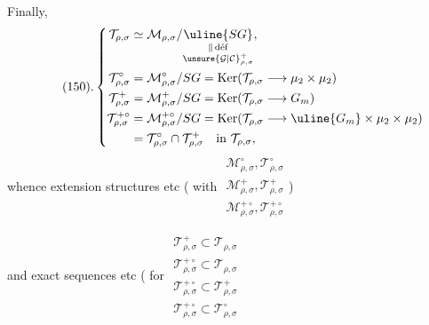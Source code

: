 Finally, 
\[
\tag*{(150).}
\left\{\begin{aligned}
\mathcal{T}_{\rho,\sigma}&\simeq
\mathcal{M}_{\rho,\sigma}/
\underset{\substack{\Vert\,\mathrm{d\acute ef}\\\unsure{\mathcal{G}|\mathcal{C}}_{\rho,\sigma}^{+}}}{\uline{SG}},\\
\mathcal{T}_{\rho,\sigma}^{\circ}&=
\mathcal{M}_{\rho,\sigma}^{\circ}/SG
=\operatorname{Ker}(\mathcal{T}_{\rho,\sigma}\longrightarrow\mu_2\times\mu_2)\\
\mathcal{T}_{\rho,\sigma}^{+}&=
\mathcal{M}_{\rho,\sigma}^{+}/SG
=\operatorname{Ker}(\mathcal{T}_{\rho,\sigma}\longrightarrow G_m)\\
\mathcal{T}_{\rho,\sigma}^{+\circ}&=
\mathcal{M}_{\rho,\sigma}^{+\circ}/SG
=\operatorname{Ker}(\mathcal{T}_{\rho,\sigma}\longrightarrow\uline{G_m}\times\mu_2\times\mu_2)\\
&=\mathcal{T}_{\rho,\sigma}^{\circ}\cap\mathcal{T}_{\rho,\sigma}^{+}
\quad\text{in }\mathcal{T}_{\rho,\sigma},
\end{aligned}\right.
\]
whence extension structures
etc ( with
$\begin{array}{l}
\mathcal{M}_{\rho,\sigma}^{\circ},\mathcal{T}_{\rho,\sigma}^{\circ}\\
\mathcal{M}_{\rho,\sigma}^{+},\mathcal{T}_{\rho,\sigma}^{+}\\
\mathcal{M}_{\rho,\sigma}^{+\circ},\mathcal{T}_{\rho,\sigma}^{+\circ}
\end{array}$)

and exact sequences
etc ( for
$\begin{array}{l}
\mathcal{T}_{\rho,\sigma}^{+}\subset\mathcal{T}_{\rho,\sigma}\\
\mathcal{T}_{\rho,\sigma}^{+\circ}\subset\mathcal{T}_{\rho,\sigma}\\
\mathcal{T}_{\rho,\sigma}^{+\circ}\subset\mathcal{T}_{\rho,\sigma}^{+}\\
\mathcal{T}_{\rho,\sigma}^{+\circ}\subset\mathcal{T}_{\rho,\sigma}^{\circ}
\end{array}$

